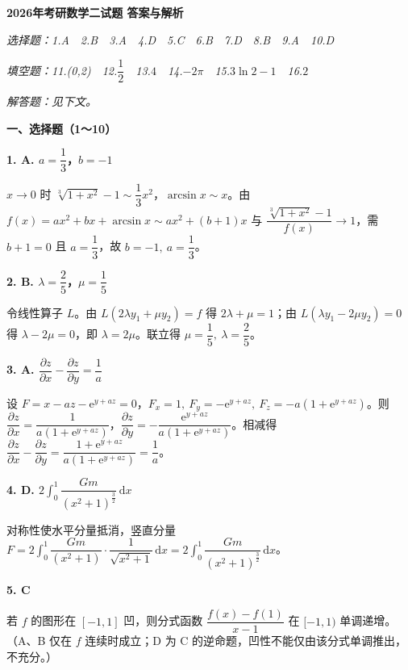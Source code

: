 \documentclass[UTF8,11pt]{ctexart}
\begin{document}
{\Large\bfseries 2026年考研数学二试题 答案与解析}\par\vspace{4pt}
\par\small\color{gray}\emph{选择题：1.A　2.B　3.A　4.D　5.C　6.B　7.D　8.B　9.A　10.D}\par
\par\small\color{gray}\emph{填空题：11.(0,2)　12.$\dfrac12$　13.$4$　14.$-2\pi$　15.$3\ln2-1$　16.$2$}\par
\par\small\color{gray}\emph{解答题：见下文。}\par
{\Large\bfseries 一、选择题（1～10）}\par\vspace{4pt}
\par\noindent\textbf{1. A. $a=\dfrac13$，$b=-1$}\par
$x\to0$ 时 $\sqrt[3]{1+x^2}-1\sim\dfrac13x^2$，$\arcsin x\sim x$。由 $f(x)=ax^2+bx+\arcsin x\sim ax^2+(b+1)x$ 与 $\dfrac{\sqrt[3]{1+x^2}-1}{f(x)}\to1$，需 $b+1=0$ 且 $a=\dfrac13$，故 $b=-1,\ a=\dfrac13$。
\par\noindent\textbf{2. B. $\lambda=\dfrac25$，$\mu=\dfrac15$}\par
令线性算子 $L$。由 $L(2\lambda y_1+\mu y_2)=f$ 得 $2\lambda+\mu=1$；由 $L(\lambda y_1-2\mu y_2)=0$ 得 $\lambda-2\mu=0$，即 $\lambda=2\mu$。联立得 $\mu=\dfrac15,\ \lambda=\dfrac25$。
\par\noindent\textbf{3. A. $\dfrac{\partial z}{\partial x}-\dfrac{\partial z}{\partial y}=\dfrac1a$}\par
设 $F=x-az-\mathrm{e}^{y+az}=0$，$F_x=1,\ F_y=-\mathrm{e}^{y+az},\ F_z=-a(1+\mathrm{e}^{y+az})$。则
$\dfrac{\partial z}{\partial x}=\dfrac{1}{a(1+\mathrm{e}^{y+az})}$，$\dfrac{\partial z}{\partial y}=-\dfrac{\mathrm{e}^{y+az}}{a(1+\mathrm{e}^{y+az})}$。相减得 $\dfrac{\partial z}{\partial x}-\dfrac{\partial z}{\partial y}=\dfrac{1+\mathrm{e}^{y+az}}{a(1+\mathrm{e}^{y+az})}=\dfrac1a$。
\par\noindent\textbf{4. D. $2\displaystyle\int_0^1\dfrac{Gm}{(x^2+1)^{\frac32}}\,\mathrm{d}x$}\par
对称性使水平分量抵消，竖直分量 $F=2\displaystyle\int_0^1\dfrac{Gm}{(x^2+1)}\cdot\dfrac{1}{\sqrt{x^2+1}}\,\mathrm{d}x=2\int_0^1\dfrac{Gm}{(x^2+1)^{\frac32}}\,\mathrm{d}x$。
\par\noindent\textbf{5. C}\par
若 $f$ 的图形在 $[-1,1]$ 凹，则分式函数 $\dfrac{f(x)-f(1)}{x-1}$ 在 $[-1,1)$ 单调递增。（A、B 仅在 $f$ 连续时成立；D 为 C 的逆命题，凹性不能仅由该分式单调推出，不充分。）
\end{document}
